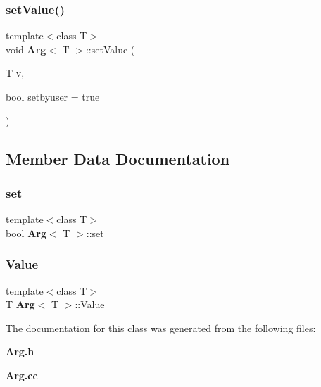 \mbox{\label{classArg_aefc75ae92ac7bf02c49a0505dd7ff47f}} 
\subsubsection{set\+Value()}
{\footnotesize\ttfamily template$<$class T$>$ \\
void \textbf{ Arg}$<$ T $>$\+::set\+Value (\begin{DoxyParamCaption}\item[{T}]{v,  }\item[{bool}]{setbyuser = {\ttfamily true} }\end{DoxyParamCaption})}



\subsection{Member Data Documentation}
\mbox{\label{classArg_a2c6301a5c51cf6b1fe2df5467f09c63b}} 
\subsubsection{set}
{\footnotesize\ttfamily template$<$class T$>$ \\
bool \textbf{ Arg}$<$ T $>$\+::set\hspace{0.3cm}{\ttfamily [private]}}

\mbox{\label{classArg_a1b84483d29ec731faa62d69710ef4f18}} 
\subsubsection{Value}
{\footnotesize\ttfamily template$<$class T$>$ \\
T \textbf{ Arg}$<$ T $>$\+::Value\hspace{0.3cm}{\ttfamily [private]}}



The documentation for this class was generated from the following files\+:\begin{DoxyCompactItemize}
\item 
\textbf{ Arg.\+h}\item 
\textbf{ Arg.\+cc}\end{DoxyCompactItemize}

